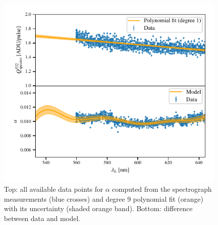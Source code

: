 \begin{figure}[h]
    \centering
    \includegraphics[width=\columnwidth]{fig/alpha_532_qswMAX.pdf}
    \caption{Top: all available data points for $\alpha$ computed from the spectrograph measurements (blue crosses) and degree 9 polynomial fit (orange) with its uncertainty (shaded orange band). Bottom: difference between data and model.}
    \label{fig:alpha_532}
\end{figure}


